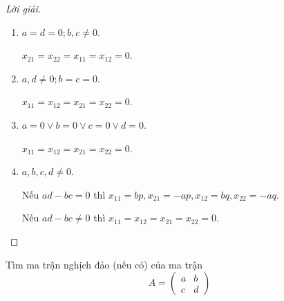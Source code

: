 \documentclass[class=linearalgebra,crop=false]{standalone}
\begin{document}
\begin{proof}[Lời giải]
\begin{enumerate}[label = Trường hợp \arabic*:,itemindent=2cm]
        \item $a = d = 0; b, c\ne 0$.
              \par $x_{21} = x_{22} = x_{11} = x_{12} = 0$.
        \item $a, d\ne 0; b = c = 0$.
              \par $x_{11} = x_{12} = x_{21} = x_{22} = 0$.
        \item $a = 0\vee b = 0 \vee c = 0 \vee d = 0$.
              \par $x_{11} = x_{12} = x_{21} = x_{22} = 0$.
        \item $a,b,c,d\ne 0$.
              \par Nếu $ad - bc = 0$ thì $x_{11} = bp, x_{21} = -ap, x_{12} = bq, x_{22} = -aq$.
              \par Nếu $ad - bc \ne 0$ thì $x_{11} = x_{12} = x_{21} = x_{22} = 0$.
    \end{enumerate}
\end{proof}

\begin{exercise}
    Tìm ma trận nghịch đảo (nếu có) của ma trận
    \[
        A =
        \begin{pmatrix}
            a & b \\
            c & d
        \end{pmatrix}
    \]
\end{exercise}
\end{document}
